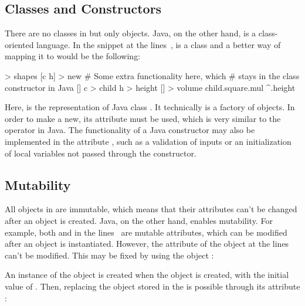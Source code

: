 \subsection{Classes and Constructors}

There are no classes in \eo{} but only objects. Java, on the other hand,
is a class-oriented language. In the snippet
at the lines~,  is a class
and a better way of mapping it to \eo{} would be the following:

\begin{ffcode}
[] > shapes
  [c h] > new
    # Some extra functionality here, which
    # stays in the class constructor in Java
    []
      c > child
      h > height
      [] > volume
        child.square.mul ^.height
\end{ffcode}

Here,  is the representation of Java class . It technically
is a factory of objects. In order to make a new, its attribute 
must be used, which is very similar to the operator  in Java.
The functionality of a Java constructor may also be implemented
in the attribute , such as a validation of inputs or
an initialization of local variables not passed through the constructor.

\subsection{Mutability}

All objects in \eo{} are immutable, which means that their attributes
can't be changed after an object is created. Java, on the other hand,
enables mutability. For example, both  and  in the
lines~ are mutable attributes,
which can be modified after an object is instantiated. However,
the attribute  of the \eo{} object  at the
lines~ can't be modified. This
may be fixed by using the object :


An instance of the object  is created when the object 
is created, with the initial value of . Then, replacing the
object stored in the  is possible through its attribute :

